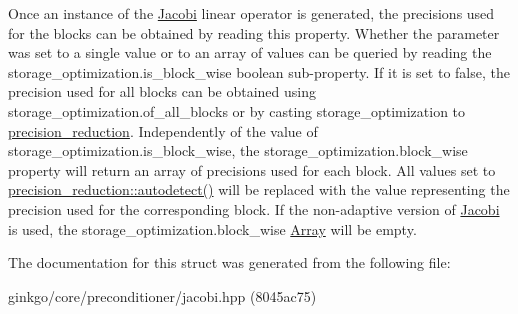 Once an instance of the \hyperlink{classgko_1_1preconditioner_1_1Jacobi}{Jacobi} linear operator is generated, the precisions used for the blocks can be obtained by reading this property. Whether the parameter was set to a single value or to an array of values can be queried by reading the {\ttfamily storage\+\_\+optimization.\+is\+\_\+block\+\_\+wise} boolean sub-\/property. If it is set to {\ttfamily false}, the precision used for all blocks can be obtained using {\ttfamily storage\+\_\+optimization.\+of\+\_\+all\+\_\+blocks} or by casting {\ttfamily storage\+\_\+optimization} to {\ttfamily \hyperlink{classgko_1_1precision__reduction}{precision\+\_\+reduction}}. Independently of the value of {\ttfamily storage\+\_\+optimization.\+is\+\_\+block\+\_\+wise}, the {\ttfamily storage\+\_\+optimization.\+block\+\_\+wise} property will return an array of precisions used for each block. All values set to {\ttfamily \hyperlink{classgko_1_1precision__reduction_ac4109c61fadb24db7a1888c51ac483e9}{precision\+\_\+reduction\+::autodetect()}} will be replaced with the value representing the precision used for the corresponding block. If the non-\/adaptive version of \hyperlink{classgko_1_1preconditioner_1_1Jacobi}{Jacobi} is used, the {\ttfamily storage\+\_\+optimization.\+block\+\_\+wise} \hyperlink{classgko_1_1Array}{Array} will be empty. 

The documentation for this struct was generated from the following file\+:\begin{DoxyCompactItemize}
\item 
ginkgo/core/preconditioner/jacobi.\+hpp (8045ac75)\end{DoxyCompactItemize}
